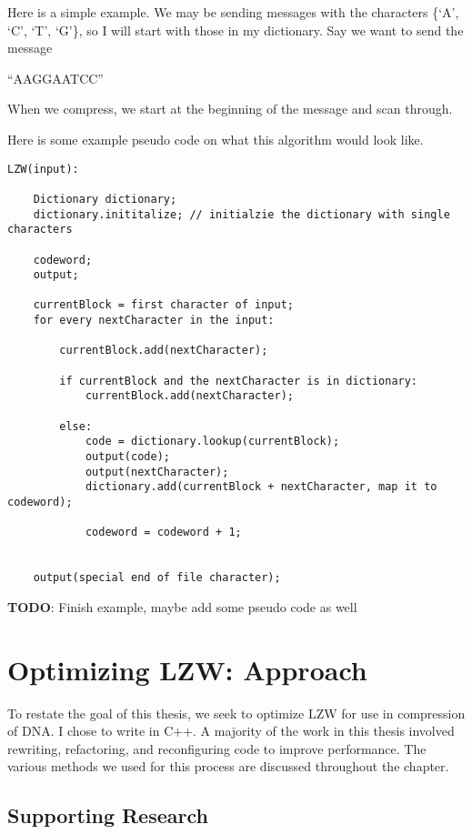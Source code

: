 \documentclass[12pt,twoside]{reedthesis}
\begin{document}
Here is a simple example. We may be sending messages with the characters \{`A', `C', `T', `G'\}, so I will start with those in my dictionary. Say we want to send the message

``AAGGAATCC''

When we compress, we start at the beginning of the message and scan through.

Here is some example pseudo code on what this algorithm would look like.
\begin{verbatim}
LZW(input):

    Dictionary dictionary;
    dictionary.inititalize; // initialzie the dictionary with single characters

    codeword;
    output;

    currentBlock = first character of input;
    for every nextCharacter in the input:

        currentBlock.add(nextCharacter);

        if currentBlock and the nextCharacter is in dictionary:
            currentBlock.add(nextCharacter);
            
        else:
            code = dictionary.lookup(currentBlock);
            output(code);
            output(nextCharacter);
            dictionary.add(currentBlock + nextCharacter, map it to codeword);

            codeword = codeword + 1;


    output(special end of file character);
\end{verbatim}
\textbf{TODO}: Finish example, maybe add some pseudo code as well

\hypertarget{optimizing-lzw-approach}{%
\chapter{Optimizing LZW: Approach}\label{optimizing-lzw-approach}}

To restate the goal of this thesis, we seek to optimize LZW for use in compression of DNA. I chose to write in C++. A majority of the work in this thesis involved rewriting, refactoring, and reconfiguring code to improve performance. The various methods we used for this process are discussed throughout the chapter.

\hypertarget{supporting-research}{%
\section{Supporting Research}\label{supporting-research}}
\end{document}
